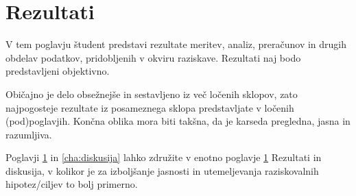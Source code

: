 \chapter{Rezultati}\label{cha:rezultati}
V tem poglavju študent predstavi rezultate meritev, analiz, preračunov in drugih obdelav podatkov, pridobljenih v okviru raziskave. Rezultati naj bodo predstavljeni objektivno.

Običajno je delo obsežnejše in sestavljeno iz več ločenih sklopov, zato najpogosteje rezultate iz posameznega sklopa predstavljate v ločenih (pod)poglavjih. Končna oblika mora biti takšna, da je karseda pregledna, jasna in razumljiva.

Poglavji \ref{cha:rezultati} in \ref{cha:diskusija} lahko združite v enotno poglavje \ref{cha:rezultati} Rezultati in diskusija, v kolikor je za izboljšanje jasnosti in utemeljevanja raziskovalnih hipotez/ciljev to bolj primerno.
